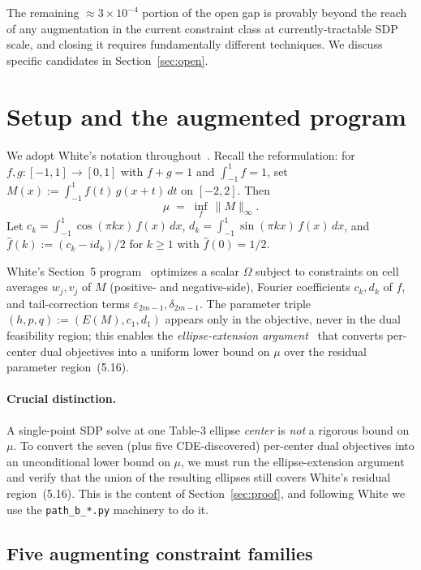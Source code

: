 \documentclass[11pt]{article}
\theoremstyle{plain}
\theoremstyle{definition}
\begin{document}
The remaining $\approx 3 \times 10^{-4}$ portion of the open gap is
provably beyond the reach of any augmentation in the current
constraint class at currently-tractable SDP scale, and closing it
requires fundamentally different techniques. We discuss specific
candidates in Section~\ref{sec:open}.

\section{Setup and the augmented program}\label{sec:setup}

We adopt White's notation throughout~\cite[\S2]{White2023}. Recall the
reformulation: for $f, g : [-1, 1] \to [0, 1]$ with $f + g = 1$ and
$\int_{-1}^1 f = 1$, set
\(
M(x) := \int_{-1}^1 f(t)\, g(x + t)\, dt
\)
on $[-2, 2]$. Then
\[
\mu \;=\; \inf_f\, \|M\|_\infty.
\]
Let $c_k = \int_{-1}^1 \cos(\pi k x)\, f(x)\, dx$,
$d_k = \int_{-1}^1 \sin(\pi k x)\, f(x)\, dx$, and
$\hat f(k) := (c_k - i d_k)/2$ for $k \ge 1$ with $\hat f(0) = 1/2$.

White's Section~5 program~\cite[\S5]{White2023} optimizes a scalar
$\Omega$ subject to constraints on cell averages $w_j, v_j$ of $M$
(positive- and negative-side), Fourier coefficients $c_k, d_k$ of $f$,
and tail-correction terms $\varepsilon_{2m-1}, \delta_{2m-1}$. The
parameter triple $(h, p, q) := (E(M), c_1, d_1)$ appears only in the
objective, never in the dual feasibility region; this enables the
\emph{ellipse-extension argument}~\cite[\S5.1, App.~II]{White2023} that
converts per-center dual objectives into a uniform lower bound on $\mu$
over the residual parameter region~(5.16).

\paragraph{Crucial distinction.}
A single-point SDP solve at one Table-3 ellipse \emph{center} is
\emph{not} a rigorous bound on $\mu$. To convert the seven
(plus five CDE-discovered) per-center dual objectives into an
unconditional lower bound on $\mu$, we must run the
ellipse-extension argument and verify that the union of the resulting
ellipses still covers White's residual region~(5.16). This is the
content of Section~\ref{sec:proof}, and following White we use the
\texttt{path\_b\_*.py} machinery to do it.

\subsection{Five augmenting constraint families}\label{sec:families}
\end{document}
